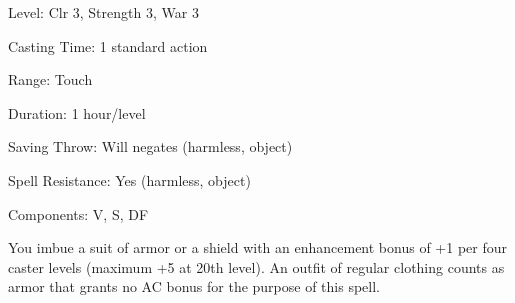 
\begin{description*}
\item[Level:] Clr 3, Strength 3, War 3
\item[Casting Time:] 1 standard action
\item[Range:] Touch
\item[Duration:] 1 hour/level
\item[Saving Throw:] Will negates (harmless, object)
\item[Spell Resistance:] Yes (harmless, object)
\item[Components:] V, S, DF
\end{description*}

You imbue a suit of armor or a shield with an enhancement bonus of +1 per four
caster levels (maximum +5 at 20th level).
An outfit of regular clothing counts as armor that grants no AC bonus for the purpose
of this spell.